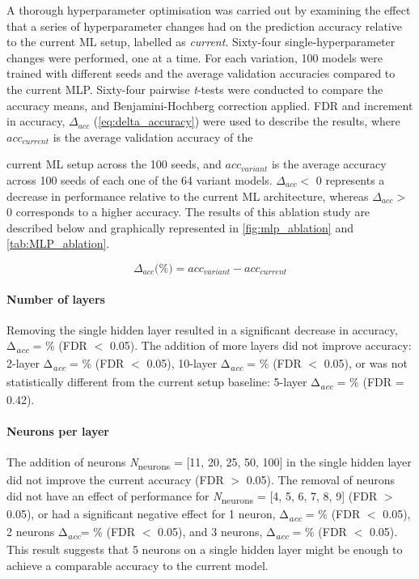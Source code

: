 A thorough hyperparameter optimisation was carried out by examining the effect that a series of hyperparameter changes had on the prediction accuracy relative to the current ML setup, labelled as \textit{current}. Sixty-four single-hyperparameter changes were performed, one at a time. For each variation, 100 models were trained with different seeds and the average validation accuracies compared to the current MLP. Sixty-four pairwise \textit{t}-tests were conducted to compare the accuracy means, and Benjamini-Hochberg correction \cite{BENJAMINI_1995_FDR} applied. FDR and increment in accuracy, $\Delta_{acc}$ (\autoref{eq:delta_accuracy}) were used to describe the results, where $acc_{current}$ is the average validation accuracy of the {current ML setup across the 100 seeds, and $acc_{variant}$ is the average accuracy across 100 seeds of each one of the 64 variant models. $\Delta_{acc} <$ 0 represents a decrease in performance relative to the current ML architecture, whereas $\Delta_{acc} >$ 0 corresponds to a higher accuracy. The results of this ablation study are described below and graphically represented in \autoref{fig:mlp_ablation} and \autoref{tab:MLP_ablation}.

\begin{equation}
\Delta_{acc} \text{(\%)} = acc_{variant} - acc_{current}
\label{eq:delta_accuracy}
\end{equation}
\vspace{-37pt} %

\paragraph{Number of layers}

Removing the single hidden layer resulted in a significant decrease in accuracy, Δ\textsubscript{\textit{acc}} = \% (FDR $<$ 0.05). The addition of more layers did not improve accuracy: 2-layer Δ\textsubscript{\textit{acc}} = \% (FDR $<$ 0.05), 10-layer Δ\textsubscript{\textit{acc}} = \% (FDR $<$ 0.05), or was not statistically different from the current setup baseline: 5-layer Δ\textsubscript{\textit{acc}} = \% (FDR = 0.42).

\paragraph{Neurons per layer}

The addition of neurons \textit{N}\textsubscript{neurons} = [11, 20, 25, 50, 100] in the single hidden layer did not improve the current accuracy (FDR $>$ 0.05). The removal of neurons did not have an effect of performance for \textit{N}\textsubscript{neurons} = [4, 5, 6, 7, 8, 9] (FDR $>$ 0.05), or had a significant negative effect for 1 neuron, Δ\textsubscript{\textit{acc}} = \% (FDR $<$ 0.05), 2 neurons Δ\textsubscript{\textit{acc}}= \% (FDR $<$ 0.05), and 3 neurons, Δ\textsubscript{\textit{acc}} = \% (FDR $<$ 0.05). This result suggests that 5 neurons on a single hidden layer might be enough to achieve a comparable accuracy to the current model.

}
